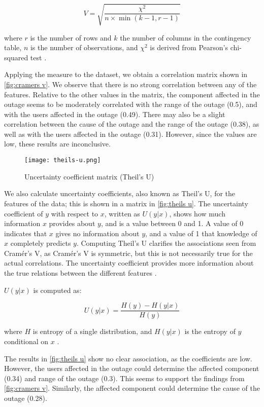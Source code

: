 $$
V = \sqrt{\frac{\chi^2}{n \times \min{(k-1, r-1)}}}
$$

where $r$ is the number of rows and $k$ the number of columns in the contingency table, $n$ is the number of observations, and $\chi^2$ is derived from Pearson's chi-squared test \cite{holmes1998}.

Applying the measure to the dataset, we obtain a correlation matrix shown in \autoref{fig:cramers v}.
We observe that there is no strong correlation between any of the features.
Relative to the other values in the matrix, the component affected in the outage seems to be moderately correlated with the range of the outage (0.5), and with the users affected in the outage (0.49).
There may also be a slight correlation between the cause of the outage and the range of the outage (0.38), as well as with the users affected in the outage (0.31).
However, since the values are low, these results are inconclusive.

\begin{figure}[h]
  \centering
  \texttt{[image: theils-u.png]}
  \caption{Uncertainty coefficient matrix (Theil's U)}
  \label{fig:theils u}
\end{figure}

We also calculate uncertainty coefficients, also known as Theil's U, for the features of the data; this is shown in a matrix in \autoref{fig:theils u}.
The uncertainty coefficient of $y$ with respect to $x$, written as $U(y|x)$, shows how much information $x$ provides about $y$, and is a value between 0 and 1.
A value of 0 indicates that $x$ gives no information about $y$, and a value of 1 that knowledge of $x$ completely predicts $y$.
Computing Theil's U clarifies the associations seen from Cram\'{e}r's V, as Cram\'{e}r's V is symmetric, but this is not necessarily true for the actual correlations.
The uncertainty coefficient provides more information about the true relations between the different features \cite{zychlinski2018}.

$U(y|x)$ is computed as:

$$
U(y|x) = \frac{H(y) - H(y|x)}{H(y)}
$$

where $H$ is entropy of a single distribution, and $H(y|x)$ is the entropy of $y$ conditional on $x$ \cite{press2007}.

The results in \autoref{fig:theils u} show no clear association, as the coefficients are low.
However, the users affected in the outage could determine the affected component (0.34) and range of the outage (0.3).
This seems to support the findings from \autoref{fig:cramers v}.
Similarly, the affected component could determine the cause of the outage (0.28).
